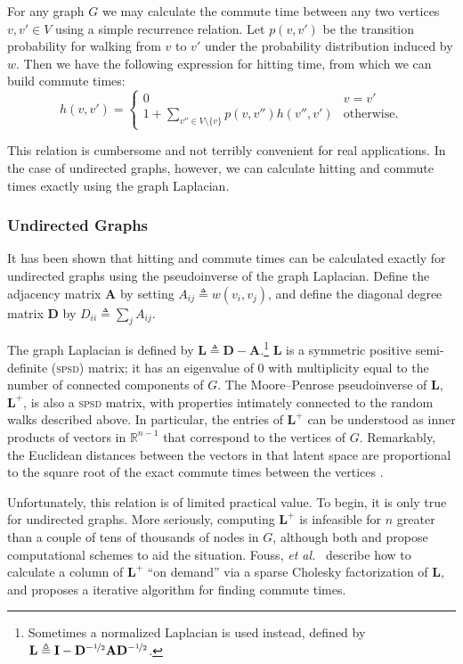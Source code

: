 \documentclass{acm_proc_article-sp}
\newcommand{\bm}[1]{\mathbf{#1}}
\newcommand{\deq}{\triangleq}
\newcommand{\R}{\mathbb{R}}
\begin{document}
For any graph $G$ we may calculate the commute time between any two
vertices $v, v' \in V$ using a simple recurrence relation.  Let $p(v,
v')$ be the transition probability for walking from $v$ to $v'$ under
the probability distribution induced by $w$.  Then we have the
following expression for hitting time, from which we can build commute
times:
\begin{equation}\label{hittingiterative}
  h(v, v') = 
  \begin{cases}
    0 & v = v' \\
    1 + \sum_{v'' \in V \setminus \lbrace v \rbrace} p(v, v'') h(v'', v') & \text{otherwise.}
  \end{cases}
\end{equation}

This relation is cumbersome and not terribly convenient for real
applications.  In the case of undirected graphs, however, we can
calculate hitting and commute times exactly using the graph Laplacian.

\subsubsection{Undirected Graphs}

It has been shown \citep{fouss, brand} that hitting and commute times
can be calculated exactly for undirected graphs using the
pseudoinverse of the graph Laplacian.  Define the adjacency matrix
$\bm{A}$ by setting $A_{ij} \deq w(v_i, v_j)$, and define the diagonal
degree matrix $\bm{D}$ by $D_{ii} \deq \sum_j A_{ij}$.

The graph Laplacian is defined by $\bm{L} \deq \bm{D} -
\bm{A}$.\footnote{Sometimes a normalized Laplacian is used instead,
  defined by $\bm{L} \deq \bm{I} -
  \bm{D}^{-\nicefrac{1}{2}}\bm{A}\bm{D}^{-\nicefrac{1}{2}}$.}
$\bm{L}$ is a symmetric positive semi-definite (\textsc{spsd}) matrix;
it has an eigenvalue of 0 with multiplicity equal to the number of
connected components of $G$.  The Moore--Penrose pseudoinverse of
$\bm{L}$, $\bm{L}^+$, is also a \textsc{spsd} matrix, with properties
intimately connected to the random walks described above.  In
particular, the entries of $\bm{L}^+$ can be understood as inner
products of vectors in $\R^{n-1}$ that correspond to the vertices of
$G$.  Remarkably, the Euclidean distances between the vectors in that
latent space are proportional to the square root of the exact commute
times between the vertices \citep{fouss}.

Unfortunately, this relation is of limited practical value.  To begin,
it is only true for undirected graphs.  More seriously, computing
$\bm{L}^+$ is infeasible for $n$ greater than a couple of tens of
thousands of nodes in $G$, although both \citep{fouss} and
\citep{brand} propose computational schemes to aid the situation.
Fouss, \emph{et al.}\ \citep{fouss} describe how to calculate a
column of $\bm{L}^+$ ``on demand'' via a sparse Cholesky factorization
of $\bm{L}$, and \citep{brand} proposes a iterative algorithm for
finding commute times.
\end{document}
